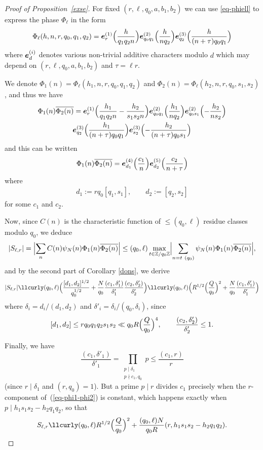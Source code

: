 \documentclass[12pt,a4paper,reqno]{amsart}
\numberwithin{equation}{section}
\theoremstyle{plain}
\theoremstyle{definition}
\newcommand\Z{\mathbb{Z}}
\newcommand{\uple}[1]{\text{\boldmath${#1}$}}
\renewcommand{\lessapprox}{\llcurly}
\begin{document}
\begin{proof}[Proof of Proposition~\ref{exse}]
 For fixed $(r,\ell,q_0,a, b_1,b_2)$ we can use \eqref{eq-phiell} to express the phase
  $\Phi_{\ell}$ in the form
$$
\Phi_{\ell}(h,n,r,q_0,q_1,q_2)=
\uple{e}^{(1)}_r\Bigl(\frac{h}{q_1q_2n}\Bigr)
\uple{e}^{(2)}_{q_0q_1}\Bigl(\frac{h}{nq_2}\Bigr)
\uple{e}^{(3)}_{q_2}\Bigl(\frac{h}{(n+\tau)q_0q_1}\Bigr)
$$
where $\uple{e}^{(i)}_{d}$ denotes various non-trivial additive characters
modulo $d$ which may depend on $(r,\ell,q_0,a,b_1,b_2)$ and $\tau=\ell
r$. 
\par
We denote $\Phi_1(n)=\Phi_{\ell}(h_1,n,r,q_0,q_1,q_2)$ and
$\Phi_2(n)=\Phi_{\ell}(h_2,n,r,q_0,s_1,s_2)$, and thus we have
\begin{multline}\label{eq-phi1-phi2}
  \Phi_1(n)\overline{\Phi_2(n)}
  =\uple{e}_r^{(1)}\Bigl(\frac{h_1}{q_1q_2n}-\frac{h_2}{s_1s_2n}\Bigr)
  \uple{e}_{q_0q_1}^{(2)}\Bigl(\frac{h_1}{nq_2}\Bigr)
  \uple{e}_{q_0s_1}^{(2)}\Bigl(-\frac{h_2}{ns_2}\Bigr)\\
  \uple{e}_{q_2}^{(3)}\Bigl(\frac{h_1}{(n+\tau)q_0q_1}\Bigr)
  \uple{e}_{s_2}^{(3)}\Bigl(-\frac{h_2}{(n+\tau)q_0s_1}\Bigr)
\end{multline}
and this can be written
$$
\Phi_1(n)\overline{\Phi_2(n)} =\uple{e}^{(4)}_{d_1} \Bigl( \frac{c_1}{n}
\Bigr) \uple{e}_{d_2}^{(5)}\Bigl( \frac{c_2}{n+\tau} \Bigr)
$$
where
\begin{gather*}
  d_1 := r q_0 [q_1,s_1],\quad\quad
  d_2 := [q_2,s_2] 
\end{gather*}
for some $c_1$ and $c_2$. 
\par
Now, since $C(n)$ is the characteristic function
of $\leq (q_0,\ell)$ residue classes modulo $q_0$, we deduce
$$
|S_{\ell,r}|=
\Bigl|\sum_{n}C(n)\psi_N(n)\Phi_1(n)\overline{\Phi_2(n)}\Bigr|
\leq (q_0,\ell)
\max_{t\in \Z/q_0\Z}
\Bigl|\sum_{n=t\ (q_0)} 
\psi_N(n)\Phi_1(n)\overline{\Phi_2(n)}\Bigr|,
$$
and by the second part of Corollary \ref{dons}, we derive
$$
|S_{\ell,r}|\lessapprox (q_0,\ell)
\Bigl(\frac{[d_1,d_2]^{1/2}}{q_0^{1/2}}+
\frac{N}{q_0}\frac{(c_1,\delta'_1)}{\delta'_1}\frac{(c_2,\delta'_2)}{\delta'_2}
\Bigr) \lessapprox (q_0,\ell)
\Bigl(R^{1/2}\Bigl(\frac{Q}{q_0}\Bigr)^2+
\frac{N}{q_0}\frac{(c_1,\delta'_1)}{\delta'_1} \Bigr)
$$
where $\delta_i=d_i/(d_1,d_2)$ and $\delta'_i = \delta_i/(q_0,\delta_i)$, since
$$
[d_1,d_2]\leq rq_0q_1q_2s_1s_2\ll
q_0R\Bigl(\frac{Q}{q_0}\Bigr)^4,\quad\quad
\frac{(c_2,\delta'_2)}{\delta'_2}\leq 1.
$$
\par
Finally, we have
$$ 
\frac{(c_1,\delta'_1)}{\delta'_1}=\prod_{\substack{p\mid
    \delta_1\\p\nmid c_1, q_0}}p \leq \frac{(c_1,r)}{r}
$$
(since $r\mid \delta_1$ and $(r,q_0)=1$). But a prime $p\mid r$ divides $c_1$
precisely when the $r$-component of~(\ref{eq-phi1-phi2}) is constant,
which happens exactly when $p\mid h_1s_1s_2-h_2q_1q_2$, so that
$$
S_{\ell,r}\lessapprox (q_0,\ell)R^{1/2}\Bigl(\frac{Q}{q_0}\Bigr)^2+
\frac{(q_0,\ell)N}{q_0R}(r,h_1s_1s_2-h_2q_1q_2).
$$
\end{proof}
\end{document}
